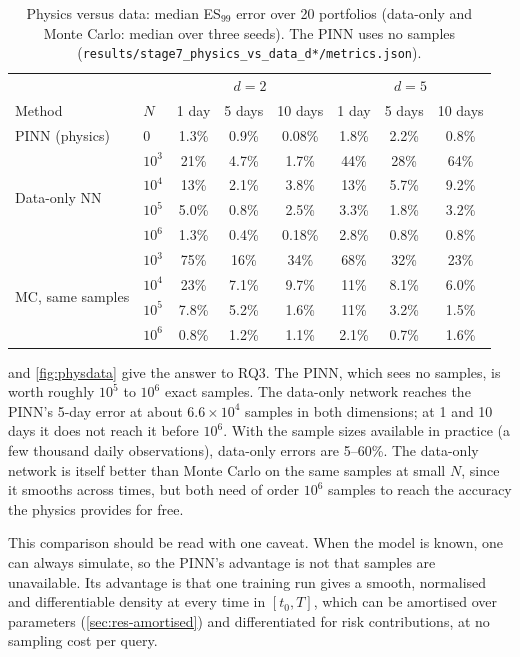 \begin{table}[t]
  \centering
  \caption{Physics versus data: median ES$_{99}$ error over 20 portfolios (data-only and Monte Carlo:
    median over three seeds). The PINN uses no samples
    (\texttt{results/stage7\_physics\_vs\_data\_d*/metrics.json}).}
  \label{tab:physdata}
  \begin{tabular}{llccc@{\hspace{2em}}ccc}
    \toprule
    & & \multicolumn{3}{c}{$d = 2$} & \multicolumn{3}{c}{$d = 5$} \\
    Method & $N$ & 1 day & 5 days & 10 days & 1 day & 5 days & 10 days \\
    \midrule
    PINN (physics)   & 0       & 1.3\% & 0.9\% & 0.08\% & 1.8\% & 2.2\% & 0.8\% \\
    \midrule
    \multirow{4}{*}{Data-only NN}
      & $10^3$ & 21\%  & 4.7\% & 1.7\% & 44\% & 28\% & 64\% \\
      & $10^4$ & 13\%  & 2.1\% & 3.8\% & 13\% & 5.7\% & 9.2\% \\
      & $10^5$ & 5.0\% & 0.8\% & 2.5\% & 3.3\% & 1.8\% & 3.2\% \\
      & $10^6$ & 1.3\% & 0.4\% & 0.18\% & 2.8\% & 0.8\% & 0.8\% \\
    \midrule
    \multirow{4}{*}{MC, same samples}
      & $10^3$ & 75\% & 16\% & 34\% & 68\% & 32\% & 23\% \\
      & $10^4$ & 23\% & 7.1\% & 9.7\% & 11\% & 8.1\% & 6.0\% \\
      & $10^5$ & 7.8\% & 5.2\% & 1.6\% & 11\% & 3.2\% & 1.5\% \\
      & $10^6$ & 0.8\% & 1.2\% & 1.1\% & 2.1\% & 0.7\% & 1.6\% \\
    \bottomrule
  \end{tabular}
\end{table}

 and \cref{fig:physdata} give the answer to RQ3. The PINN, which sees no samples, is worth
roughly $10^5$ to $10^6$ exact samples. The data-only network reaches the PINN's 5-day error at about
$6.6\times10^4$ samples in both dimensions; at 1 and 10 days it does not reach it before $10^6$. With the sample
sizes available in practice (a few thousand daily observations), data-only errors are 5--60\%. The data-only
network is itself better than Monte Carlo on the same samples at small $N$, since it smooths across times, but
both need of order $10^6$ samples to reach the accuracy the physics provides for free.

This comparison should be read with one caveat. When the model is known, one can always simulate, so the
PINN's advantage is not that samples are unavailable. Its advantage is that one training run gives a smooth,
normalised and differentiable density at every time in $[t_0, T]$, which can be amortised over parameters
(\cref{sec:res-amortised}) and differentiated for risk contributions, at no sampling cost per query.

